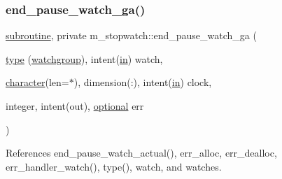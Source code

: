 \subsubsection{\texorpdfstring{end\+\_\+pause\+\_\+watch\+\_\+ga()}{end\_pause\_watch\_ga()}}
{\footnotesize\ttfamily \hyperlink{M__stopwatch_83_8txt_acfbcff50169d691ff02d4a123ed70482}{subroutine}, private m\+\_\+stopwatch\+::end\+\_\+pause\+\_\+watch\+\_\+ga (\begin{DoxyParamCaption}\item[{\hyperlink{stop__watch_83_8txt_a70f0ead91c32e25323c03265aa302c1c}{type} (\hyperlink{structm__stopwatch_1_1watchgroup}{watchgroup}), intent(\hyperlink{M__journal_83_8txt_afce72651d1eed785a2132bee863b2f38}{in})}]{watch,  }\item[{\hyperlink{option__stopwatch_83_8txt_abd4b21fbbd175834027b5224bfe97e66}{character}(len=$\ast$), dimension(\+:), intent(\hyperlink{M__journal_83_8txt_afce72651d1eed785a2132bee863b2f38}{in})}]{clock,  }\item[{integer, intent(out), \hyperlink{option__stopwatch_83_8txt_aa4ece75e7acf58a4843f70fe18c3ade5}{optional}}]{err }\end{DoxyParamCaption})\hspace{0.3cm}{\ttfamily [private]}}



References end\+\_\+pause\+\_\+watch\+\_\+actual(), err\+\_\+alloc, err\+\_\+dealloc, err\+\_\+handler\+\_\+watch(), type(), watch, and watches.

